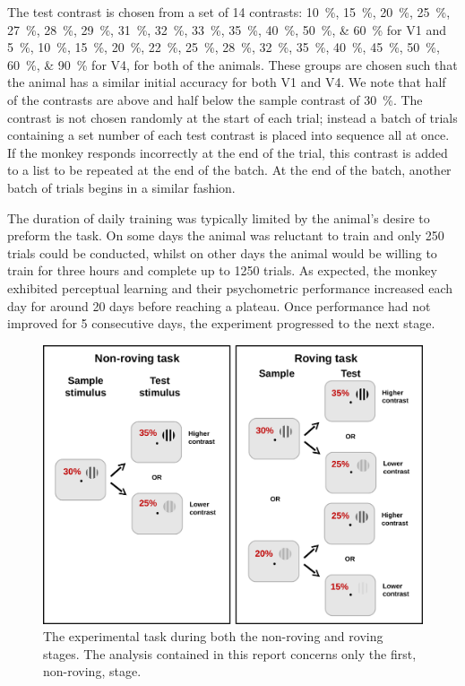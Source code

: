 The test contrast is chosen from a set of 14 contrasts:
\SIlist[list-units = brackets]{10;15;20;25;27;28;29;31;32;33;35;40;50;60}{\percent} for \ac{V1} and
\SIlist[list-units = brackets]{5;10;15;20;22;25;28;32;35;40;45;50;60;90}{\percent} for \ac{V4},
for both of the animals.
These groups are chosen such that the animal has a similar initial accuracy for both \ac{V1} and \ac{V4}.
We note that half of the contrasts are above and half below the sample contrast of \SI{30}{\percent}.
The contrast is not chosen randomly at the start of each trial; instead a batch of trials containing a set number of each test contrast is placed into sequence all at once.
If the monkey responds incorrectly at the end of the trial, this contrast is added to a list to be repeated at the end of the batch.
At the end of the batch, another batch of trials begins in a similar fashion.

The duration of daily training was typically limited by the animal's desire to preform the task.
On some days the animal was reluctant to train and only 250 trials could be conducted, whilst on other days the animal would be willing to train for three hours and complete up to 1250 trials.
As expected, the monkey exhibited perceptual learning and their psychometric performance increased each day for around 20 days before reaching a plateau.
Once performance had not improved for 5 consecutive days, the experiment progressed to the next stage.


\begin{figure}[htbp]
\begin{center}
\includegraphics[width=0.8\linewidth]{figs/info/PLtask2.pdf}
\end{center}
\caption{The experimental task during both the non-roving and roving stages.
The analysis contained in this report concerns only the first, non-roving, stage.}
\label{fig:pltask2}
\end{figure}

